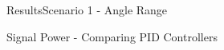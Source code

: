 \begin{frame}{Results}{Scenario 1 - Angle Range}
\begin{block}{Signal Power - Comparing PID Controllers}
\begin{figure}[H]
{    }
  \end{figure}
  
  \end{block}

\end{frame}